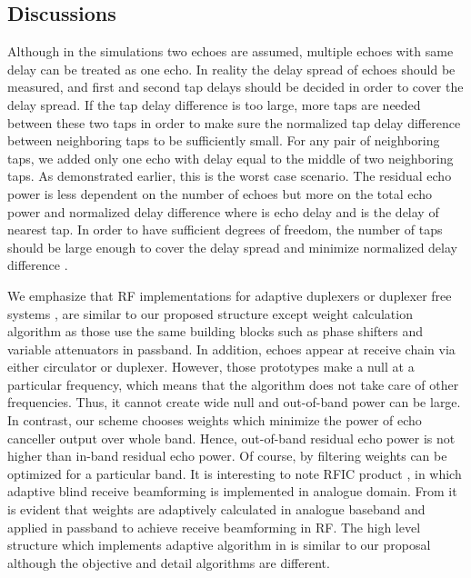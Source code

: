 \documentclass[twocolumn]{IEEEtran}
\begin{document}
\subsection{Discussions}

Although in the simulations two echoes are assumed, multiple echoes
with same delay can be treated as one echo. In reality the delay
spread of echoes should be measured, and first and second tap delays
should be decided in order to cover the delay spread. If the tap
delay difference is too large, more taps are needed between these
two taps in order to make sure the normalized tap delay difference
between neighboring taps  to be sufficiently
small. For any pair of neighboring taps, we added only one echo with
delay equal to the middle of two neighboring taps. As demonstrated
earlier, this is the worst case scenario. The residual echo power is
less dependent on the number of echoes but more on the total echo
power and normalized delay difference  where 
is echo delay and  is the delay of nearest tap. In order to
have sufficient degrees of freedom, the number of taps should be
large enough to cover the delay spread and minimize normalized delay
difference .

We emphasize that RF implementations for adaptive duplexers or
duplexer free systems \cite{dfs1}, \cite{dfs2} are similar to our
proposed structure except weight calculation algorithm as those use
the same building blocks such as phase shifters and variable
attenuators in passband. In addition, echoes appear at receive chain
via either circulator or duplexer. However, those prototypes make a
null at a particular frequency, which means that the algorithm does
not take care of other frequencies. Thus, it cannot create wide null
and out-of-band power can be large. In contrast, our scheme chooses
weights which minimize the power of echo canceller output over whole
band. Hence, out-of-band residual echo power is not higher than
in-band residual echo power. Of course, by filtering  weights
can be optimized for a particular band. It is interesting to note
RFIC product \cite{motia}, \cite{motia2} in which adaptive blind
receive beamforming is implemented in analogue domain. From
\cite{motia2} it is evident that weights are adaptively calculated
in analogue baseband and applied in passband to achieve receive
beamforming in RF. The high level structure which implements
adaptive algorithm in \cite{motia2} is similar to our proposal
although the objective and detail algorithms are different.
\end{document}

